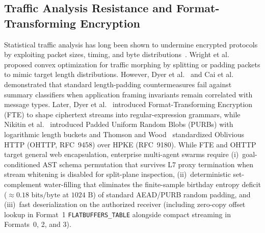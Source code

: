 \documentclass[conference,10pt]{IEEEtran}
\begin{document}
\subsection{Traffic Analysis Resistance and Format-Transforming Encryption}
Statistical traffic analysis has long been shown to undermine encrypted protocols by exploiting packet sizes, timing, and byte distributions~\cite{wright2009traffic, dyer2012peekaboo, cai2014systematic, panchenko2016website, sirinam2018deep}. Wright et al.~\cite{wright2009traffic} proposed convex optimization for traffic morphing by splitting or padding packets to mimic target length distributions. However, Dyer et al.~\cite{dyer2012peekaboo} and Cai et al.~\cite{cai2014systematic} demonstrated that standard length-padding countermeasures fail against summary classifiers when application framing invariants remain correlated with message types. Later, Dyer et al.~\cite{dyer2013protocol} introduced Format-Transforming Encryption (FTE) to shape ciphertext streams into regular-expression grammars, while Nikitin et al.~\cite{nikitin2019purbs} introduced Padded Uniform Random Blobs (PURBs) with logarithmic length buckets and Thomson and Wood~\cite{thomson2024ohttp} standardized Oblivious HTTP (OHTTP, RFC~9458) over HPKE (RFC~9180). While FTE and OHTTP target general web encapsulation, enterprise multi-agent swarms require (i)~goal-conditioned AST schema permutation that survives L7 proxy termination when stream whitening is disabled for split-plane inspection, (ii)~deterministic set-complement water-filling that eliminates the finite-sample birthday entropy deficit ($\approx 0.18\text{ bits/byte}$ at $1024\text{ B}$) of standard AEAD/PURB random padding, and (iii)~fast deserialization on the authorized receiver (including zero-copy offset lookup in Format~1 \texttt{FLATBUFFERS\_TABLE} alongside compact streaming in Formats~0, 2, and 3).
\end{document}
